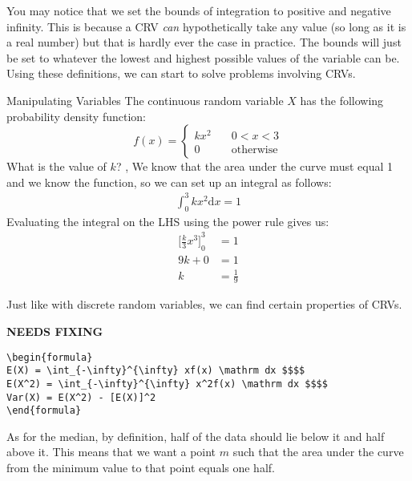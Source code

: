 \documentclass[../../main.tex]{subfiles}
\begin{document}
You may notice that we set the bounds of integration to positive and negative infinity. This is because a CRV \textit{can} hypothetically take any value (so long as it is a real number) but that is hardly ever the case in practice. The bounds will just be set to whatever the lowest and highest possible values of the variable can be. Using these definitions, we can start to solve problems involving CRVs.
\begin{example}{Manipulating Variables}
The continuous random variable $X$ has the following probability density function:
$$f(x) = 
        \begin{cases}
            kx^2 & \quad 0 < x < 3 \\
            0 & \quad \text{otherwise}
        \end{cases}
$$
What is the value of $k$? 
\sep
We know that the area under the curve must equal 1 and we know the function, so we can set up an integral as follows:
\begin{align}
    \int_0^3 kx^2 \mathrm dx = 1
\end{align}
Evaluating the integral on the LHS using the power rule gives us:
\begin{align}
    {\Big[\frac{k}3 x^3\Big]}_0^3 &= 1 \\
    9k + 0 &= 1 \\
    k &= \frac{1}9
\end{align}
\end{example}

Just like with discrete random variables, we can find certain properties of CRVs.

{\hfill\Large\bfseries NEEDS FIXING\hfill}
\begin{lstlisting}
\begin{formula}
E(X) = \int_{-\infty}^{\infty} xf(x) \mathrm dx $$$$
E(X^2) = \int_{-\infty}^{\infty} x^2f(x) \mathrm dx $$$$
Var(X) = E(X^2) - [E(X)]^2
\end{formula}
 \end{lstlisting}

As for the median, by definition, half of the data should lie below it and half above it. This means that we want a point $m$ such that the area under the curve from the minimum value to that point equals one half.
\end{document}
